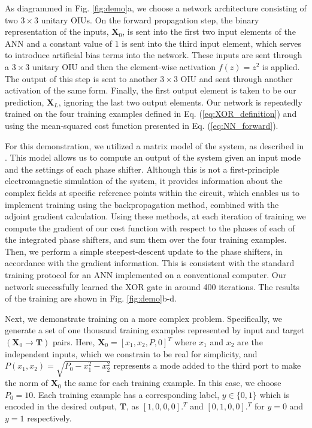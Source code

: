 As diagrammed in Fig. \ref{fig:demo}a, we choose a network architecture consisting of two $3 \times 3$ unitary OIUs.  On the forward propagation step, the binary representation of the inputs, $\textbf{X}_0$, is sent into the first two input elements of the ANN and a constant value of $1$ is sent into the third input element, which serves to introduce artificial bias terms into the network.  These inputs are sent through a $3 \times 3$ unitary OIU and then the element-wise activation $f(z) = z^2$ is applied.  The output of this step is sent to another $3 \times 3$ OIU and sent through another activation of the same form.  Finally, the first output element is taken to be our prediction, $\textbf{X}_L$, ignoring the last two output elements.  Our network is repeatedly trained on the four training examples defined in Eq. (\ref{eq:XOR_definition}) and using the mean-squared cost function presented in Eq. (\ref{eq:NN_forward}).

For this demonstration, we utilized a matrix model of the system, as described in \cite{Reck1994,Clements2016}.  This model allows us to compute an output of the system given an input mode and the settings of each phase shifter.  Although this is not a first-principle electromagnetic simulation of the system, it provides information about the complex fields at specific reference points within the circuit, which enables us to implement training using the backpropagation method, combined with the adjoint gradient calculation.  Using these methods, at each iteration of training we compute the gradient of  our cost function with respect to the phases of each of the integrated phase shifters, and sum them over the four training examples.  Then, we perform a simple steepest-descent update to the phase shifters, in accordance with the gradient information. This is consistent with the standard training protocol for an ANN implemented on a conventional computer.  Our network successfully learned the XOR gate in around 400 iterations. The results of the training are shown in Fig. \ref{fig:demo}b-d.

Next, we demonstrate training on a more complex problem. Specifically, we generate a set of one thousand training examples represented by input and target $(\mathbf{X}_0 \to \mathbf{T})$ pairs. Here, $\mathbf{X}_0 = [x_1, x_2, P, 0]^T$ where $x_1$ and $x_2$ are the independent inputs, which we constrain to be real for simplicity, and $P(x_1, x_2)= \sqrt{P_0-x_1^2-x_2^2}$ represents a mode added to the third port to make the norm of $\mathbf{X}_0$ the same for each training example.  In this case, we choose $P_0 = 10$.  Each training example has a corresponding label, $y \in \{0,1\}$ which is encoded in the desired output, $\mathbf{T}$, as $[1, 0, 0, 0].^T$ and $[0, 1, 0, 0].^T$ for $y = 0$ and $y=1$ respectively.

